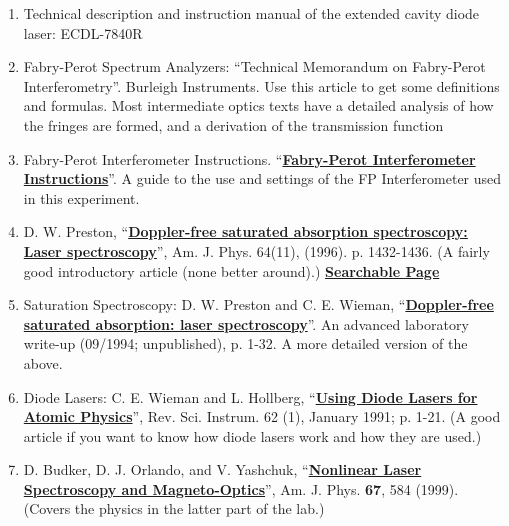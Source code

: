 \documentclass{../lab}
\begin{document}
\begin{enumerate}
    \item Technical description and instruction manual of the extended cavity diode laser: ECDL-7840R

    \item Fabry-Perot Spectrum Analyzers: ``Technical Memorandum on Fabry-Perot Interferometry''. Burleigh Instruments. Use this article to get some definitions and formulas. Most intermediate optics texts have a detailed analysis of how the fringes are formed, and a derivation of the transmission function

    \item Fabry-Perot Interferometer Instructions. ``\href{http://physics111.lib.berkeley.edu/Physics111/Reprints/MNO/Fabry-Perot\_Instructions\_OCR.pdf}{\textbf{Fabry-Perot Interferometer Instructions}}''. A guide to the use and settings of the FP Interferometer used in this experiment.

    \item D. W. Preston, ``\href{http://ajp.aapt.org/resource/1/ajpias/v64/i11/p1432\_s1}{\textbf{Doppler-free saturated absorption spectroscopy: Laser spectroscopy}}'', Am. J. Phys. 64(11), (1996). p. 1432-1436. (A fairly good introductory article (none better around).) \href{http://physics111.lib.berkeley.edu/Physics111/Reprints/MNO/03-Doppler\_Free\_Saturated\_Absoprtion.pdf}{\textbf{Searchable Page}}

    \item Saturation Spectroscopy: D. W. Preston and C. E. Wieman, ``\href{http://physics111.lib.berkeley.edu/Physics111/Reprints/MNO/04-Doppler\_Free\_Saturated\_Absoprtion.pdf}{\textbf{Doppler-free saturated absorption: laser spectroscopy}}''. An advanced laboratory write-up (09/1994; unpublished), p. 1-32. A more detailed version of the above.

    \item Diode Lasers: C. E. Wieman and L. Hollberg, ``\href{http://rsi.aip.org/resource/1/rsinak/v62/i1/p1\_s1}{\textbf{Using Diode Lasers for Atomic Physics}}'', Rev. Sci. Instrum. 62 (1), January 1991; p. 1-21. (A good article if you want to know how diode lasers work and how they are used.)

    \item D. Budker, D. J. Orlando, and V. Yashchuk, ``\href{http://ajp.aapt.org/resource/1/ajpias/v67/i7/p584\_s1}{\textbf{Nonlinear Laser Spectroscopy and Magneto-Optics}}'', Am. J. Phys. \textbf{67}, 584 (1999). (Covers the physics in the latter part of the lab.)


\end{enumerate}
\end{document}
